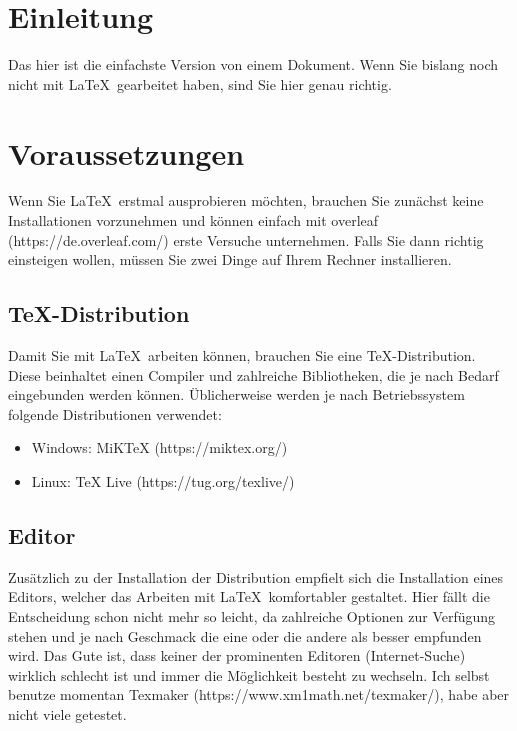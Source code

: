\documentclass[12pt,a4paper]{scrartcl}
\begin{document}
%
\section{Einleitung}
Das hier ist die einfachste Version von einem Dokument. 
Wenn Sie bislang noch nicht mit \LaTeX\, gearbeitet haben, sind Sie hier genau richtig.
%
\section{Voraussetzungen}
Wenn Sie \LaTeX\, erstmal ausprobieren möchten, brauchen Sie zunächst keine Installationen vorzunehmen und können einfach mit overleaf (https://de.overleaf.com/) erste Versuche unternehmen.
Falls Sie dann richtig einsteigen wollen, müssen Sie zwei Dinge auf Ihrem Rechner installieren.
%
\subsection{TeX-Distribution}
Damit Sie mit \LaTeX\, arbeiten können, brauchen Sie eine TeX-Distribution.
Diese beinhaltet einen Compiler und zahlreiche Bibliotheken, die je nach Bedarf eingebunden werden können.
Üblicherweise werden je nach Betriebssystem folgende Distributionen verwendet:
%
\begin{itemize}
\item Windows: MiKTeX (https://miktex.org/)
\item Linux: TeX Live (https://tug.org/texlive/)
\end{itemize}
%
\subsection{Editor}
Zusätzlich zu der Installation der Distribution empfielt sich die Installation eines Editors, welcher das Arbeiten mit \LaTeX\, komfortabler gestaltet. 
Hier fällt die Entscheidung schon nicht mehr so leicht, da zahlreiche Optionen zur Verfügung stehen und je nach Geschmack die eine oder die andere als besser empfunden wird.
Das Gute ist, dass keiner der prominenten Editoren (Internet-Suche) wirklich schlecht ist und immer die Möglichkeit besteht zu wechseln.
Ich selbst benutze momentan Texmaker (https://www.xm1math.net/texmaker/), habe aber nicht viele getestet.
%
\end{document}
